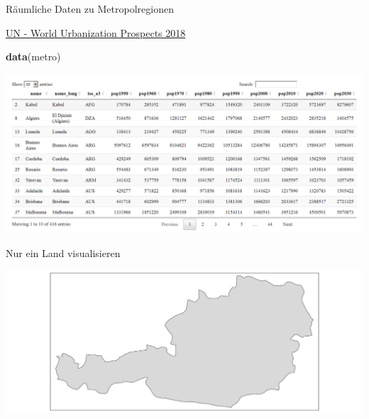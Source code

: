 \documentclass[ignorenonframetext,]{beamer}
\newenvironment{Shaded}{\begin{snugshade}}{\end{snugshade}}
\newcommand{\KeywordTok}[1]{\textcolor[rgb]{0.13,0.29,0.53}{\textbf{#1}}}
\newcommand{\NormalTok}[1]{#1}
\newcommand{\OperatorTok}[1]{\textcolor[rgb]{0.81,0.36,0.00}{\textbf{#1}}}
\newcommand{\StringTok}[1]{\textcolor[rgb]{0.31,0.60,0.02}{#1}}
\begin{document}
\begin{frame}[fragile]{Räumliche Daten zu Metropolregionen}
\protect\hypertarget{raumliche-daten-zu-metropolregionen}{}

\begin{block}{\href{https://population.un.org/wup/}{UN - World
Urbanization Prospects 2018}}

\begin{Shaded}
\begin{Highlighting}[]
\KeywordTok{data}\NormalTok{(metro)}
\end{Highlighting}
\end{Shaded}

\includegraphics{figure/tmapMetroDaten.PNG}

\end{block}

\end{frame}

\begin{frame}[fragile]{Nur ein Land visualisieren}
\protect\hypertarget{nur-ein-land-visualisieren}{}

\begin{Shaded}
\end{Shaded}

\includegraphics{A4_tmap_files/figure-beamer/unnamed-chunk-44-1.pdf}

\end{frame}
\end{document}
